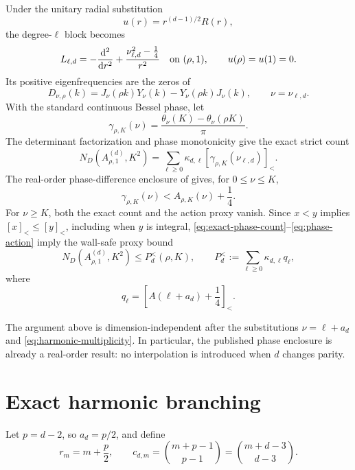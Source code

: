 \documentclass[11pt]{article}
\theoremstyle{remark}
\newcommand{\sbr}[1]{[#1]_{<}}
\begin{document}
Under the unitary radial substitution
\[
 u(r)=r^{(d-1)/2}R(r),
\]
the degree-$\ell$ block becomes
\begin{equation}
 L_{\ell,d}=-\frac{\mathrm d^2}{\mathrm dr^2}
 +\frac{\nu_{\ell,d}^2-\frac14}{r^2}
 \quad\hbox{on }(\rho,1),
 \qquad u(\rho)=u(1)=0.
 \label{eq:radial-operator}
\end{equation}
Its positive eigenfrequencies are the zeros of
\[
 D_{\nu,\rho}(k)
 =J_\nu(\rho k)Y_\nu(k)-Y_\nu(\rho k)J_\nu(k),
 \qquad \nu=\nu_{\ell,d}.
\]
With the standard continuous Bessel phase, let
\[
 \gamma_{\rho,K}(\nu)
 =\frac{\theta_\nu(K)-\theta_\nu(\rho K)}\pi.
\]
The determinant factorization and phase monotonicity give the exact strict
count
\begin{equation}
 N_D(A_{\rho,1}^{(d)},K^2)
 =\sum_{\ell\geq0}\kappa_{d,\ell}
 \sbr{\gamma_{\rho,K}(\nu_{\ell,d})}.
 \label{eq:exact-phase-count}
\end{equation}
The real-order phase-difference enclosure of
\cite{FLPSphase,FLPSannuli} gives, for $0\leq\nu\leq K$,
\begin{equation}
 \gamma_{\rho,K}(\nu)<A_{\rho,K}(\nu)+\frac14.
 \label{eq:phase-action}
\end{equation}
For $\nu\geq K$, both the exact count and the action proxy vanish.  Since
$x<y$ implies $\sbr{x}\leq\sbr{y}$, including when $y$ is integral,
\eqref{eq:exact-phase-count}--\eqref{eq:phase-action} imply the wall-safe
proxy bound
\begin{equation}
 N_D(A_{\rho,1}^{(d)},K^2)\leq P_d^{<}(\rho,K),
 \qquad
 P_d^{<}:=\sum_{\ell\geq0}\kappa_{d,\ell}q_\ell,
 \label{eq:strict-proxy}
\end{equation}
where
\begin{equation}
 q_\ell=\sbr{A(\ell+a_d)+\frac14}.
 \label{eq:q-def}
\end{equation}

The argument above is dimension-independent after the substitutions
$\nu=\ell+a_d$ and \eqref{eq:harmonic-multiplicity}.  In particular, the
published phase enclosure is already a real-order result: no interpolation
is introduced when $d$ changes parity.

\section{Exact harmonic branching}
\label{sec:branching}

Let $p=d-2$, so $a_d=p/2$, and define
\begin{equation}
 r_m=m+\frac p2,
 \qquad
 c_{d,m}=\binom{m+p-1}{p-1}=\binom{m+d-3}{d-3}.
 \label{eq:branching-weights}
\end{equation}
\end{document}
